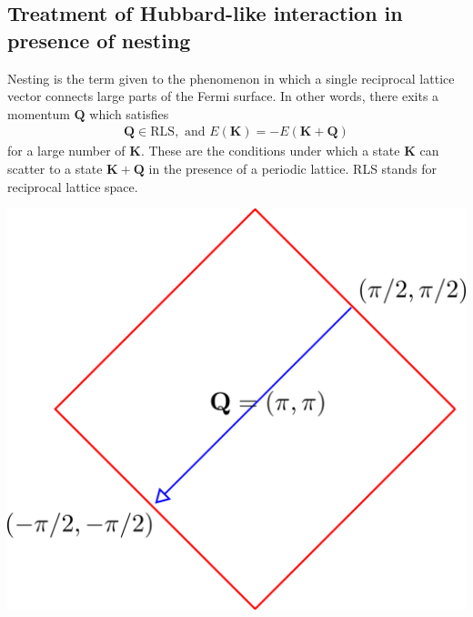 \documentclass[14pt]{extarticle}
\begin{document}
\subsection{Treatment of Hubbard-like interaction in presence of nesting}

\begin{minipage}{270pt}
	Nesting is the term given to the phenomenon in which a single reciprocal lattice vector connects large parts of the Fermi surface. In other words, there exits a momentum \(\mathbf{Q}\) which satisfies
\begin{equation}\begin{aligned}
\mathbf{Q} \in \text{RLS}, \text{ and } E(\mathbf{K}) = -E(\mathbf{K+Q})
\end{aligned}\end{equation}
for a large number of \(\mathbf{K}\). These are the conditions under which a state \(\mathbf{K}\) can scatter to a state \(\mathbf{K+Q}\) in the presence of a periodic lattice. RLS stands for reciprocal lattice space.
\end{minipage}
\hspace*{20pt}
\begin{minipage}{250pt}
\begin{center}
\includegraphics[scale=0.25]{./figures/term12.png}
\label{susc1}
\end{center}
\end{minipage}
 
\end{document}
